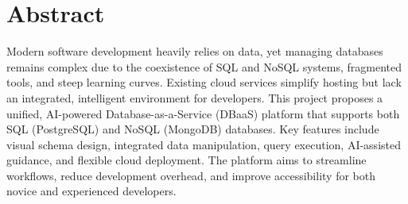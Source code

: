 \chapter*{Abstract}
Modern software development heavily relies on data, yet managing databases remains complex due to the coexistence of SQL and NoSQL systems, fragmented tools, and steep learning curves. Existing cloud services simplify hosting but lack an integrated, intelligent environment for developers. This project proposes a unified, AI-powered Database-as-a-Service (DBaaS) platform that supports both SQL (PostgreSQL) and NoSQL (MongoDB) databases. Key features include visual schema design, integrated data manipulation, query execution, AI-assisted guidance, and flexible cloud deployment. The platform aims to streamline workflows, reduce development overhead, and improve accessibility for both novice and experienced developers.
